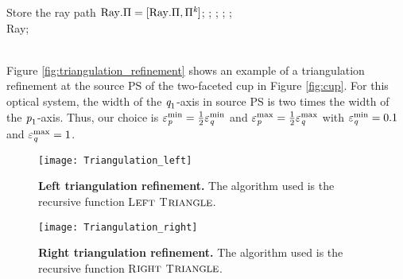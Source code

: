 \begin{algorithm}[h]
\begin{algorithmic}[1]
\State Store the ray path $\mbox{\textrm{Ray}}.\Pi= [\mbox{\textrm{Ray}}.\Pi, \Pi^{\textit{k}}]$;
\EndIf
\EndFor
\State{};
\State{};
\State{};
\State{};
\EndIf \\
\Return \textrm{Ray};
\EndProcedure
\end{algorithmic}
\end{algorithm}
\\ \indent Figure \ref{fig:triangulation_refinement} shows an example of a triangulation refinement at the source PS of the two-faceted cup in Figure \ref{fig:cup}. 
For this optical system, the width of the $\textit{q}_1$-axis in source PS is two times the width of the $\textit{p}_1$-axis.
Thus, our choice is $\varepsilon_{\textit{p}}^{\textrm{min}}=\frac{1}{2}\varepsilon_{\textit{q}}^{\textrm{min}}$ and $\varepsilon_{\textit{p}}^{\textrm{max}} = \frac{1}{2}\varepsilon_{\textit{q}}^{\textrm{max}}$
with $\varepsilon_{\textit{q}}^{\textrm{min}}=0.1$ and $\varepsilon_{\textit{q}}^{\textrm{max}}=1$.
 \begin{figure}[h]
 \begin{minipage}[t]{0.48\textwidth}
\centering
    \texttt{[image: Triangulation\_left]}
    \caption{\textbf{Left triangulation refinement.} The algorithm used is the recursive function L$\footnotesize{\textrm{EFT}}$ T$\footnotesize{\textrm{RIANGLE}}$.}
    \label{fig:triangulation_left}
\end{minipage}
\hfill
\begin{minipage}[t]{0.48\textwidth}
\centering
    \texttt{[image: Triangulation\_right]}
    \caption{\textbf{Right triangulation refinement.} The algorithm used is the recursive function R$\footnotesize{\textrm{IGHT}}$ T$\footnotesize{\textrm{RIANGLE}}$.}
    \label{fig:triangulation_right}
\end{minipage}
\end{figure}
